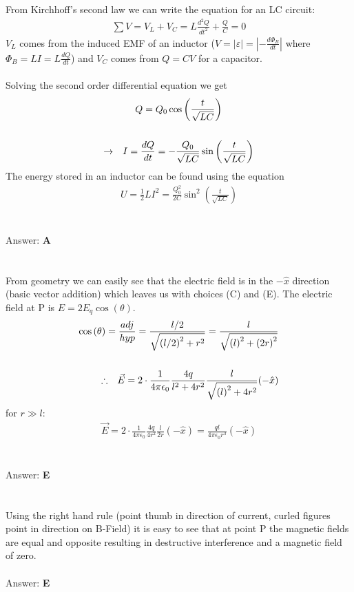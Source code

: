 \documentclass[12pt]{article}
\newcommand{\Answer}[1]{Answer: \textbf{#1}}
\newcommand{\Problem}[3]{
    \setcounter{section}{#1}
    \addtocounter{section}{-1}
    \section{}
    #3\\\\
    \Answer{#2}
}
\begin{document}
\Problem{36}{A}{%
From Kirchhoff's second law we can write the equation for an LC circuit:
\begin{align}
\sum V = V_{L} + V_{C} =  L \frac{d^{2} Q}{dt^{2}} + \frac{Q}{C} = 0
\end{align}
$V_{L}$ comes from the induced EMF of an inductor ($V = |\varepsilon| = \left|-\frac{d \Phi_{B}}{dt}\right|$ where $\Phi_{B} = LI = L \frac{dQ}{dt}$) and $V_{C}$ comes from $Q = CV$ for a capacitor.\\\\
Solving the second order differential equation we get
\begin{gather}
Q = Q_{0} \cos{\left(\frac{t}{\sqrt{LC}}\right)}\nonumber\\
\nonumber\\
\rightarrow \hspace{.1in} I = \frac{dQ}{dt} = -\frac{Q_{0}}{\sqrt{LC}}\sin{\left(\frac{t}{\sqrt{LC}}\right)}\nonumber
\end{gather}
The energy stored in an inductor can be found using the equation
\begin{align}
U = \frac{1}{2}LI^2 = \boxed{\frac{Q_{0}^{2}}{2C}\sin^2{\left(\frac{t}{\sqrt{LC}}\right)}}\nonumber
\end{align}
}

\Problem{37}{E}{%
From geometry we can easily see that the electric field is in the $-\hat{x}$ direction (basic vector addition) which leaves us with choices (C) and (E). The electric field at P is $E =2E_{q}\cos{(\theta)}$.
\begin{align}
\cos{(\theta)} = \frac{adj}{hyp} = \frac{l/2}{\sqrt{{(l/2)}^{2} +r^{2}}} = \frac{l}{\sqrt{{(l)}^{2} +{(2r)}^{2}}}\nonumber\\
\nonumber\\
\therefore \hspace{.1in}\vec{E} = 2 \cdot \frac{1}{4 \pi \epsilon_{0}} \frac{4q}{l^{2} +4r^{2}} \frac{l}{\sqrt{{(l)}^{2} +4r^{2}}}(-\hat{x})\nonumber
\end{align}
for $r \gg l$:
\begin{align}
\vec{E} = 2 \cdot \frac{1}{4 \pi \epsilon_{0}} \frac{4q}{4r^{2}} \frac{l}{{2r}}(-\hat{x}) = \boxed {\frac{ql}{4 \pi \epsilon_{0} r^3}(-\hat{x})}\nonumber
\end{align}
}

\Problem{38}{E}{%
Using the right hand rule (point thumb in direction of current, curled figures point in direction on B-Field) it is easy to see that at point P the magnetic fields are equal and opposite resulting in destructive interference and a magnetic field of zero.
}
\end{document}
